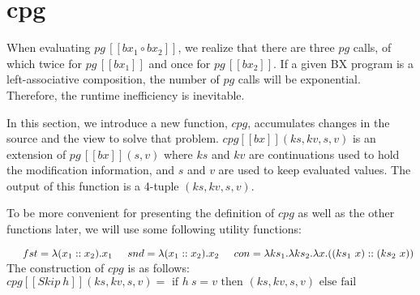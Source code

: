 \documentclass[runningheads]{llncs}
\newcommand{\tab}{\hspace*{5mm}}
\newcommand{\pg}[3]{pg \, [\![#1]\!] (#2, #3)}
\newcommand{\pginline}[1]{pg \, [\![#1]\!]}
\newcommand{\cpg}[5]{cpg [\![#1]\!] (#2, #3, #4, #5)}
\begin{document}

\section{cpg}

When evaluating $\pginline{bx_1 \circ bx_2}$, we realize that there are three $pg$ calls, of which twice for $\pginline{bx_1}$ and once for $\pginline{bx_2}$. If a given BX program is a left-associative composition, the number of $pg$ calls will be exponential. Therefore, the runtime inefficiency is inevitable.

In this section, we introduce a new function, $cpg$, accumulates changes in the source and the view to solve that problem. $\cpg{bx}{ks}{kv}{s}{v}$ is an extension of $\pg{bx}{s}{v}$ where $ks$ and $kv$ are continuations used to hold the modification information, and $s$ and $v$ are used to keep evaluated values. The output of this function is a 4-tuple $(ks, kv, s, v)$.

To be more convenient for presenting the definition of $cpg$ as well as the other functions later, we will use some following utility functions:

$\tab fst = \lambda (x_1 :: x_2). x_1\\
 \tab snd = \lambda (x_1 :: x_2). x_2\\
 \tab con = \lambda ks_1. \lambda ks_2. \lambda x. ((ks_1 \ x) :: (ks_2 \ x))$\\

The construction of $cpg$ is as follows:\\

$\cpg{Skip \ h}{ks}{kv}{s}{v} = \text{ if } h \ s = v \text{ then } (ks, kv, s, v) \text{ else fail}$\\
\end{document}
